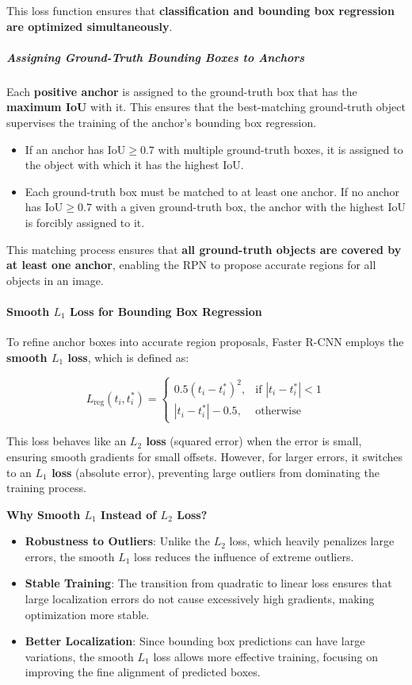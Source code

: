 This loss function ensures that \textbf{classification and bounding box regression are optimized simultaneously}.

\subparagraph{\textbf{Assigning Ground-Truth Bounding Boxes to Anchors}}
Each \textbf{positive anchor} is assigned to the ground-truth box that has the \textbf{maximum IoU} with it. This ensures that the best-matching ground-truth object supervises the training of the anchor's bounding box regression.

\begin{itemize}
    \item If an anchor has \(\text{IoU} \geq 0.7\) with multiple ground-truth boxes, it is assigned to the object with which it has the highest IoU.
    \item Each ground-truth box must be matched to at least one anchor. If no anchor has \(\text{IoU} \geq 0.7\) with a given ground-truth box, the anchor with the highest IoU is forcibly assigned to it.
\end{itemize}

This matching process ensures that \textbf{all ground-truth objects are covered by at least one anchor}, enabling the RPN to propose accurate regions for all objects in an image.

\paragraph{\textbf{Smooth \( L_1 \) Loss for Bounding Box Regression}}
To refine anchor boxes into accurate region proposals, Faster R-CNN employs the \textbf{smooth \( L_1 \) loss}, which is defined as:

\[
L_{\text{reg}}(t_i, t^*_i) =
\begin{cases}
    0.5 (t_i - t^*_i)^2, & \text{if } |t_i - t^*_i| < 1 \\
    |t_i - t^*_i| - 0.5, & \text{otherwise}
\end{cases}
\]

This loss behaves like an \textbf{\( L_2 \) loss} (squared error) when the error is small, ensuring smooth gradients for small offsets. However, for larger errors, it switches to an \textbf{\( L_1 \) loss} (absolute error), preventing large outliers from dominating the training process.

\textbf{Why Smooth \( L_1 \) Instead of \( L_2 \) Loss?}
\begin{itemize}
    \item \textbf{Robustness to Outliers}: Unlike the \( L_2 \) loss, which heavily penalizes large errors, the smooth \( L_1 \) loss reduces the influence of extreme outliers.
    \item \textbf{Stable Training}: The transition from quadratic to linear loss ensures that large localization errors do not cause excessively high gradients, making optimization more stable.
    \item \textbf{Better Localization}: Since bounding box predictions can have large variations, the smooth \( L_1 \) loss allows more effective training, focusing on improving the fine alignment of predicted boxes.
\end{itemize}

